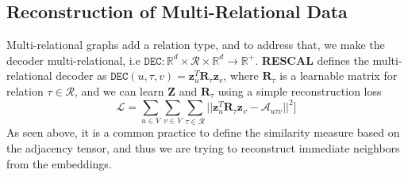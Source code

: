 \subsection{Reconstruction of Multi-Relational Data}
Multi-relational graphs add a relation type, and to address that, we make the decoder multi-relational, i.e $\texttt{DEC}: \mathbb{R}^d \times \mathcal{R} \times \mathbb{R}^d \to \mathbb{R}^+$.
\textbf{RESCAL} \cite{rescal} defines the multi-relational decoder as $\texttt{DEC}(u, \tau, v) = \mathbf{z}_u^T \mathbf{R}_\tau \mathbf{z}_v$, where $\mathbf{R}_\tau$ is a learnable matrix for relation $\tau \in \mathcal{R}$, and we can learn $\mathbf{Z}$ and $\mathbf{R}_\tau$ using a simple reconstruction loss 
\begin{equation} \label{eq:mr-recon-loss}
\mathcal{L} = \sum_{u\in V} \sum_{v\in V} \sum_{\tau \in \mathcal{R}} ||\mathbf{z}_u^T \mathbf{R}_\tau \mathbf{z}_v - \mathcal{A}_{u\tau v}||^2]
\end{equation}
As seen above, it is a common practice to define the similarity measure based on the adjacency tensor, and thus we are trying to reconstruct immediate neighbors from the embeddings. \\
